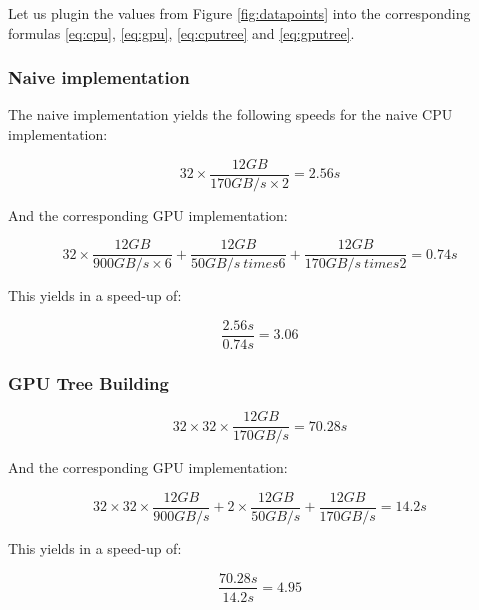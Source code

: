 \documentclass[]{article}
\begin{document}
Let us plugin the values from Figure \ref{fig:datapoints} into the corresponding formulas \ref{eq:cpu}, \ref{eq:gpu}, \ref{eq:cputree} and \ref{eq:gputree}.

\subsubsection{Naive implementation}
The naive implementation yields the following speeds for the naive CPU  implementation:

\begin{center}
	\begin{equation}
		32 \times \frac{ 12 GB }{170 GB/s \times 2} = 2.56s
	\end{equation}
\end{center}

And the corresponding GPU implementation:
\begin{center}
	\begin{equation}
		32 \times \frac{12 GB}{900 GB/s \times 6} + \frac{12 GB}{50 GB/s \ times 6}  + \frac{12 GB}{170 GB/s \ times 2} = 0.74s
	\end{equation}
\end{center}

This yields in a speed-up of:
\begin{center}
	\begin{equation}
		\frac{2.56s}{0.74s} = 3.06
	\end{equation}
\end{center}


\subsubsection{GPU Tree Building}

\begin{center}
	\begin{equation}
		32 \times 32 \times \frac{ 12 GB }{170 GB/s} = 70.28s
	\end{equation}
\end{center}

And the corresponding GPU implementation:
\begin{center}
	\begin{equation}
		32 \times 32 \times \frac{12 GB}{900 GB/s} + 2 \times \frac{12 GB}{50 GB/s}  + \frac{12 GB}{170 GB/s} = 14.2s
	\end{equation}
\end{center}

This yields in a speed-up of:
\begin{center}
	\begin{equation}
		\frac{70.28s}{14.2s} = 4.95
	\end{equation}
\end{center}
\end{document}
